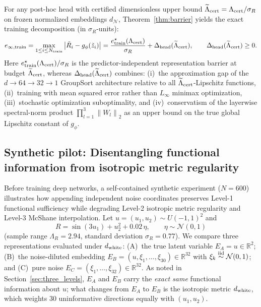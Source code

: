 \documentclass[preprint,11pt,a4paper]{elsarticle}
\newcommand{\R}{\mathbb{R}}
\newcommand{\norm}[1]{\left\lVert #1\right\rVert}
\begin{document}
For any post-hoc head with certified dimensionless upper bound $\widetilde\Lambda_{\rm cert}=\Lambda_{\rm cert}/\sigma_R$ on frozen normalized embeddings $d_{\mathcal N}$, Theorem~\ref{thm:barrier} yields the exact training decomposition (in $\sigma_R$-units):
\begin{equation}
e_{\infty,{\rm train}}
= \max_{1\le i\le N_{\rm train}}\big|\tilde R_i - g_\phi(\tilde z_i)\big|
= \frac{e^\star_{\rm train}(\Lambda_{\rm cert})}{\sigma_R} + \Delta_{\rm head}(\widetilde\Lambda_{\rm cert}),
\qquad \Delta_{\rm head}(\widetilde\Lambda_{\rm cert})\ge 0.
\label{eq:floor}
\end{equation}
Here $e^\star_{\rm train}(\Lambda_{\rm cert})/\sigma_R$ is the predictor-independent representation barrier at budget $\widetilde\Lambda_{\rm cert}$, whereas $\Delta_{\rm head}(\widetilde\Lambda_{\rm cert})$ combines: (i)~the approximation gap of the $d\to 64\to 32\to 1$ GroupSort architecture relative to all $\widetilde\Lambda_{\rm cert}$-Lipschitz functions, (ii)~training with mean squared error rather than $L_\infty$ minimax optimization, (iii)~stochastic optimization suboptimality, and (iv)~conservatism of the layerwise spectral-norm product $\prod_{l=1}^3\norm{W_l}_2$ as an upper bound on the true global Lipschitz constant of $g_\phi$.

\subsection{Synthetic pilot: Disentangling functional information from isotropic metric regularity}
\label{sec:pilot}

Before training deep networks, a self-contained synthetic experiment ($N=600$) illustrates how appending independent noise coordinates preserves Level-1 functional sufficiency while degrading Level-2 isotropic metric regularity and Level-3 McShane interpolation. Let $u=(u_1,u_2)\sim U(-1,1)^2$ and
\begin{equation}
R = \sin(3u_1) + u_2^2 + 0.02\,\eta,\qquad \eta\sim\mathcal N(0,1)
\end{equation}
(sample range $\Lambda_R=2.94$, standard deviation $\sigma_R=0.77$). We compare three representations evaluated under $d_{\rm white}$:
(A)~the true latent variable $E_A=u\in\R^2$;
(B)~the noise-diluted embedding $E_B=(u,\xi_1,\dots,\xi_{30})\in\R^{32}$ with $\xi_k\stackrel{\rm iid}{\sim}\mathcal N(0,1)$; and
(C)~pure noise $E_C=(\xi_1,\dots,\xi_{32})\in\R^{32}$.
As noted in Section~\ref{sec:three_levels}, $E_A$ and $E_B$ carry the \emph{exact same} functional information about $u$; what changes from $E_A$ to $E_B$ is the isotropic metric $d_{\rm white}$, which weights 30 uninformative directions equally with $(u_1,u_2)$.
\end{document}
